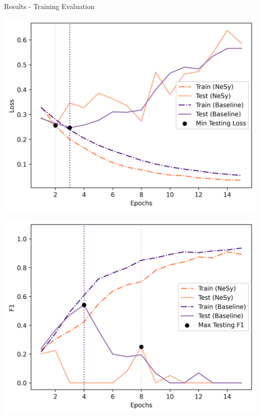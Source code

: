 \documentclass[10pt, aspectratio=169]{beamer}
\begin{document}
\begin{frame}{Results - Training Evaluation} %
     \begin{minipage}{0.48\textwidth}
        \centering
        \includegraphics[width=\textwidth]{contents/images/losses_split_14_3d.png}
    \end{minipage}
    \hfill
    \begin{minipage}{0.48\textwidth}
        \centering
        \includegraphics[width=\textwidth]{contents/images/f1_split_14_3d.png}
    \end{minipage}
\end{frame}
\end{document}
